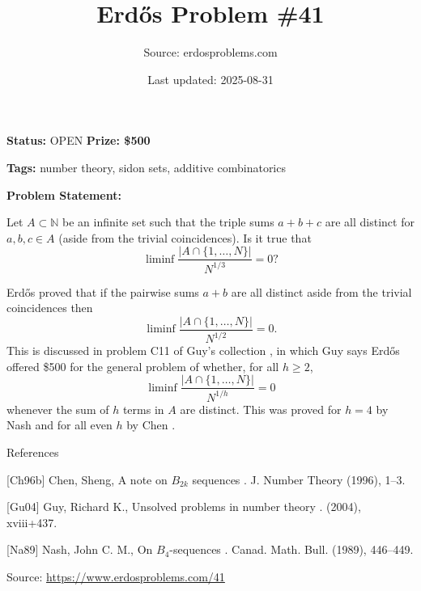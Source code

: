 \documentclass{article}
\title{Erd\H{o}s Problem \#41}
\date{Last updated: 2025-08-31}
\author{Source: erdosproblems.com}
\begin{document}
\maketitle

\noindent\textbf{Status:} OPEN \quad \textbf{Prize: \$500}

\noindent\textbf{Tags:} number theory, sidon sets, additive combinatorics

\medskip

\noindent\textbf{Problem Statement:}

Let $A\subset\mathbb{N}$ be an infinite set such that the triple sums $a+b+c$ are all distinct for $a,b,c\in A$ (aside from the trivial coincidences). Is it true that\[\liminf \frac{\lvert A\cap \{1,\ldots,N\}\rvert}{N^{1/3}}=0?\]




Erd\H{o}s proved that if the pairwise sums $a+b$ are all distinct aside from the trivial coincidences then\[\liminf \frac{\lvert A\cap \{1,\ldots,N\}\rvert}{N^{1/2}}=0.\]This is discussed in problem C11 of Guy's collection \cite{Gu04}, in which Guy says Erd\H{o}s offered \$500 for the general problem of whether, for all $h\geq 2$,\[\liminf \frac{\lvert A\cap \{1,\ldots,N\}\rvert}{N^{1/h}}=0\]whenever the sum of $h$ terms in $A$ are distinct. This was proved for $h=4$ by Nash \cite{Na89} and for all even $h$ by Chen \cite{Ch96b}.




References

[Ch96b] Chen, Sheng, A note on {$B_{2k}$} sequences . J. Number Theory (1996), 1--3.

[Gu04] Guy, Richard K., Unsolved problems in number theory . (2004), xviii+437.

[Na89] Nash, John C. M., On {$B_4$}-sequences . Canad. Math. Bull. (1989), 446--449.


\bigskip
\noindent\small{Source: \url{https://www.erdosproblems.com/41}}
\end{document}
